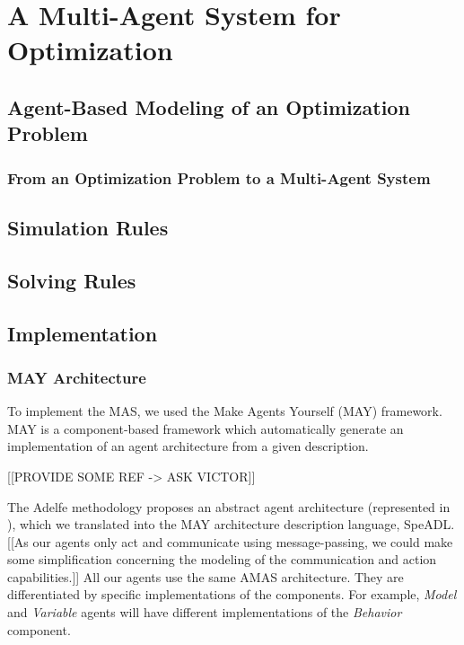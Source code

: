 \part{A Multi-Agent System for Optimization}

\chapter{Agent-Based Modeling of an Optimization Problem}

\section{From an Optimization Problem to a Multi-Agent System}

\chapter{Simulation Rules}

\chapter{Solving Rules}

\chapter{Implementation}

\section{MAY Architecture}

To implement the MAS, we used the Make Agents Yourself (MAY) framework. MAY is a component-based framework which automatically generate an implementation of an agent architecture from a given description.

[[PROVIDE SOME REF -> ASK VICTOR]]

The Adelfe methodology proposes an abstract agent architecture (represented in \fig{[[TODO]]}), which we translated into the MAY architecture description language, SpeADL. [[As our agents only act and communicate using message-passing, we could make some simplification concerning the modeling of the communication and action capabilities.]]
All our agents use the same AMAS architecture. They are differentiated by specific implementations of the components. For example, \emph{Model} and \emph{Variable} agents will have different implementations of the \emph{Behavior} component.


